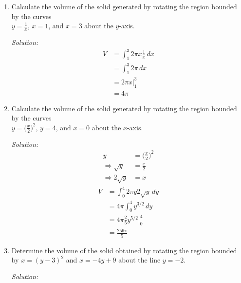 \documentclass[16pt]{article}
\theoremstyle{remark}
\begin{document}
\begin{enumerate}
\item Calculate the volume of the solid generated by rotating the region bounded by the curves\\ $\displaystyle{y=\frac{1}{x}}$, $x=1$, and $x=3$ about the $y$-axis.
\begin{mdframed}[style=TheoremFrame]
\textit{Solution:}
\begin{align*}
V&= \int_1^3 2\pi x \frac{1}{x} \, dx\\
&= \int_1^3 2\pi \, dx\\
&= 2\pi x \bigg|_1^3\\
&= 4\pi
\end{align*}
\end{mdframed}
\item Calculate the volume of the solid generated by rotating the region bounded by the curves\\ $\displaystyle{y=\bigg(\frac{x}{2}\bigg)^2}$, $y=4$, and $x=0$ about the $x$-axis.
\begin{mdframed}[style=TheoremFrame]
\textit{Solution:}
\begin{align*}
y &= \bigg(\frac{x}{2}\bigg)^2\\
\Rightarrow \sqrt{y} &= \frac{x}{2}\\
\Rightarrow 2 \sqrt{y} &= x
\end{align*}
\begin{align*}
V&= \int_0^4 2\pi y 2 \sqrt{y}\, dy\\
&= 4\pi \int_0^4 y^{3/2} \, dy\\
&= 4\pi \frac{2}{5} y^{5/2} \bigg|_0^4\\
&= \frac{256\pi}{5}
\end{align*}
\end{mdframed}
\newpage
\item Determine the volume of the solid obtained by rotating the region bounded by 
$x=(y-3)^2$ and $x=-4y+9$ about the line $y=-2$.

\begin{mdframed}[style=TheoremFrame]
\textit{Solution:}


\end{mdframed}
\end{enumerate}
\end{document}
